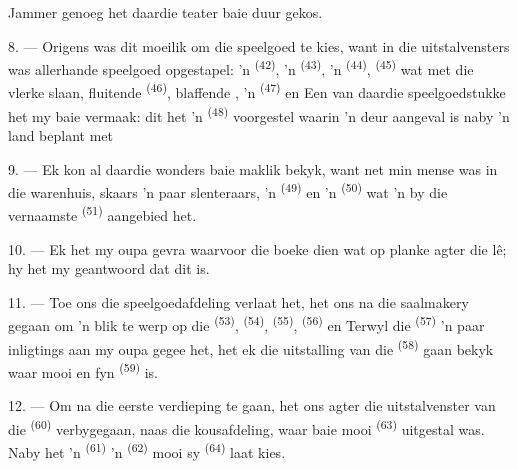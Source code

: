 Jammer genoeg het daardie teater baie duur gekos.

8. --- Origens was dit moeilik om die speelgoed te kies, want in die uitstalvensters was
allerhande speelgoed opgestapel: 'n  \textsuperscript{(42)}, 'n
 \textsuperscript{(43)}, 'n  \textsuperscript{(44)},
 \textsuperscript{(45)} wat met die vlerke slaan, fluitende 
\textsuperscript{(46)}, blaffende , 'n 
\textsuperscript{(47)} en  Een van daardie speelgoedstukke het
my baie vermaak: dit het 'n  \textsuperscript{(48)} voorgestel waarin 'n
 deur  aangeval is naby 'n land beplant met


9. --- Ek kon al daardie wonders baie maklik bekyk, want net min mense was in die
warenhuis, skaars 'n paar slenteraars, 'n  \textsuperscript{(49)} en
'n  \textsuperscript{(50)} wat 'n  by die vernaamste
 \textsuperscript{(51)} aangebied het.

10. --- Ek het my oupa gevra waarvoor die boeke dien wat op planke agter die
 lê; hy het my geantwoord dat dit  is.

\VUsaut{3.6mm}
\VUsaut{2.8mm}

11. --- Toe ons die speelgoedafdeling verlaat het, het ons na die saalmakery gegaan om 'n
blik te werp op die  \textsuperscript{(53)}, 
\textsuperscript{(54)},  \textsuperscript{(55)}, 
\textsuperscript{(56)} en  Terwyl die 
\textsuperscript{(57)} 'n paar inligtings aan my oupa gegee het, het ek die uitstalling
van die  \textsuperscript{(58)} gaan bekyk waar mooi
 en fyn  \textsuperscript{(59)} is.

12. --- Om na die eerste verdieping te gaan, het ons agter die uitstalvenster van die
 \textsuperscript{(60)} verbygegaan, naas die kousafdeling, waar baie
mooi  \textsuperscript{(63)} uitgestal was. Naby het 'n
 \textsuperscript{(61)} 'n 
\textsuperscript{(62)} mooi sy  \textsuperscript{(64)} laat kies.

